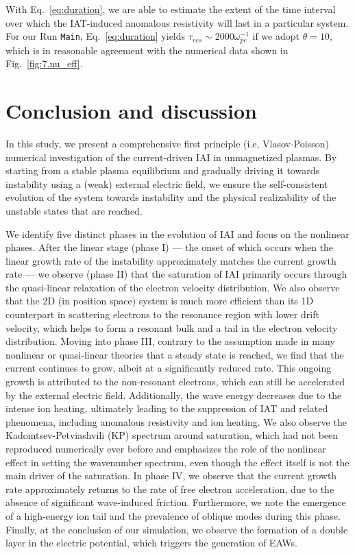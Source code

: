\documentclass[%
 reprint,
 amsmath,
 amssymb,
 aps,
 prx,
floatfix,
superscriptaddress
]{revtex4-2}
\begin{document}
With Eq.~\eqref{eq:duration}, we are able to estimate the extent of the time interval over which the IAT-induced anomalous resistivity will last in a particular system.
For our Run {\tt Main}, Eq.~\eqref{eq:duration} yields $\tau_{res} \sim 2000 \omega_{pe}^{-1}$ if we adopt $\theta = 10$, which is in reasonable agreement with the numerical data shown in Fig.~\ref{fig:7.nu_eff}.


\section{\label{sec:conclusion}Conclusion and discussion}


In this study, we present a comprehensive first principle (i.e, Vlasov-Poisson) numerical investigation of the current-driven IAI in unmagnetized plasmas. 
By starting from a stable plasma equilibrium and gradually driving it towards instability using a (weak) external electric field, we ensure the self-consistent evolution of the system towards instability and the physical realizability of the unstable states that are reached.



We identify five distinct phases in the evolution of IAI and focus on the nonlinear phases. 
After the linear stage (phase I) --- the onset of which occurs when the linear growth rate of the instability approximately matches the current growth rate --- we observe (phase II) that the saturation of IAI primarily occurs through the quasi-linear relaxation of the electron velocity distribution.
We also observe that the 2D (in position space) system is much more efficient than its 1D counterpart in scattering electrons to the resonance region with lower drift velocity, which helps to form a resonant bulk and a tail in the electron velocity distribution.
Moving into phase III, contrary to the assumption made in many nonlinear or quasi-linear theories that a steady state is reached,  we find that the current continues to grow, albeit at a significantly reduced rate. 
This ongoing growth is attributed to the non-resonant electrons, which can still be accelerated by the external electric field. 
Additionally, the wave energy decreases due to the intense ion heating, ultimately leading to the suppression of IAT and related phenomena, including anomalous resistivity and ion heating.
We also observe the Kadomtsev-Petviashvili (KP) spectrum around saturation, which had not been reproduced numerically ever before and emphasizes the role of the nonlinear effect in setting the wavenumber spectrum, even though the effect itself is not the main driver of the saturation.
In phase IV, we observe that the current growth rate approximately returns to the rate of free electron acceleration, due to the absence of significant wave-induced friction. 
Furthermore, we note the emergence of a high-energy ion tail and the prevalence of oblique modes during this phase. 
Finally, at the conclusion of our simulation, we observe the formation of a double layer in the electric potential, which triggers the generation of EAWs.
\end{document}
